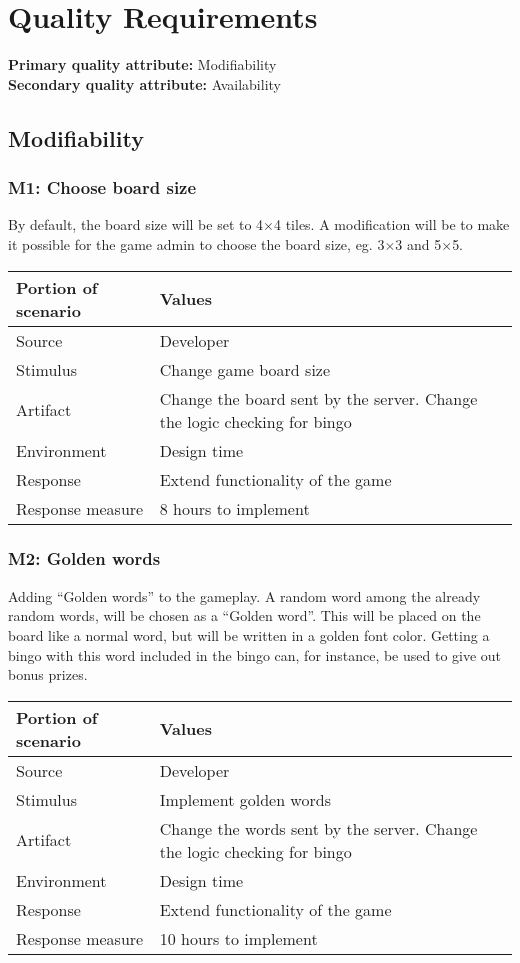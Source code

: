 \section{Quality Requirements}

{\bf Primary quality attribute: } Modifiability\\
{\bf Secondary quality attribute: } Availability

\subsection{Modifiability}

\subsubsection*{M1: Choose board size}
By default, the board size will be set to 4$\times$4 tiles.
A modification will be to make it possible for the game admin to choose the
board size, eg. 3$\times$3 and 5$\times$5.

\begin{tabular}{|m{}|m{}|}
\hline
{\bf Portion of scenario} & {\bf Values} \\ \hline
Source & Developer \\ \hline
Stimulus & Change game board size \\ \hline
Artifact & Change the board sent by the server. Change the logic
checking for bingo \\ \hline
Environment & Design time \\ \hline
Response & Extend functionality of the game \\ \hline
Response measure & 8 hours to implement \\ \hline
\end{tabular}
\newline

\subsubsection*{M2: Golden words}
Adding ``Golden words'' to the gameplay. A random word among the already random
words, will be chosen as a ``Golden word''. This will be placed on the board
like a normal word, but will be written in a golden font color. Getting a bingo
with this word included in the bingo can, for instance, be used to give out
bonus prizes.

\begin{tabular}{|m{}|m{}|}
\hline
{\bf Portion of scenario} & {\bf Values} \\ \hline
Source & Developer \\ \hline
Stimulus & Implement golden words \\ \hline
Artifact & Change the words sent by the server. Change the logic
checking for bingo \\ \hline
Environment & Design time \\ \hline
Response & Extend functionality of the game \\ \hline
Response measure & 10 hours to implement \\ \hline
\end{tabular}

